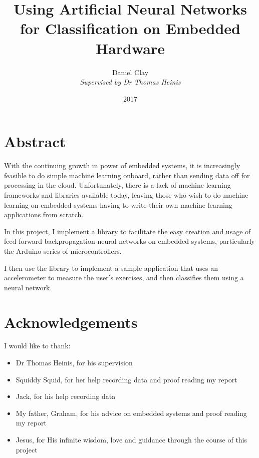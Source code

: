 \documentclass[a4paper]{article}
\begin{document}
\title{Using Artificial Neural Networks for Classification on Embedded Hardware}
\date{2017}
\author{
Daniel Clay\\
\emph{Supervised by Dr Thomas Heinis}\\ 
}
\maketitle
\pagebreak

\section{Abstract}
\label{sec:ab}

With the continuing growth in power of embedded systems, it is increasingly feasible to do simple machine learning onboard, rather than sending data off for processing in the cloud. 
Unfortunately, there is a lack of machine learning frameworks and libraries available today, leaving those who wish to do machine learning on embedded systems having to write their own machine learning applications from scratch. 

In this project, I implement a library to facilitate the easy creation and usage of feed-forward backpropagation neural networks on embedded systems, particularly the Arduino series of microcontrollers.

I then use the library to implement a sample application that uses an accelerometer to measure the user's exercises, and then classifies them using a neural network.

\section{Acknowledgements}
\label{sec:ak}

I would like to thank:

\begin{itemize}
\item Dr Thomas Heinis, for his supervision
\item Squiddy Squid, for her help recording data and proof reading my report
\item Jack, for his help recording data
\item My father, Graham, for his advice on embedded systems and proof reading my report
\item Jesus, for His infinite wisdom, love and guidance through the course of this project
\end{itemize}
\end{document}

